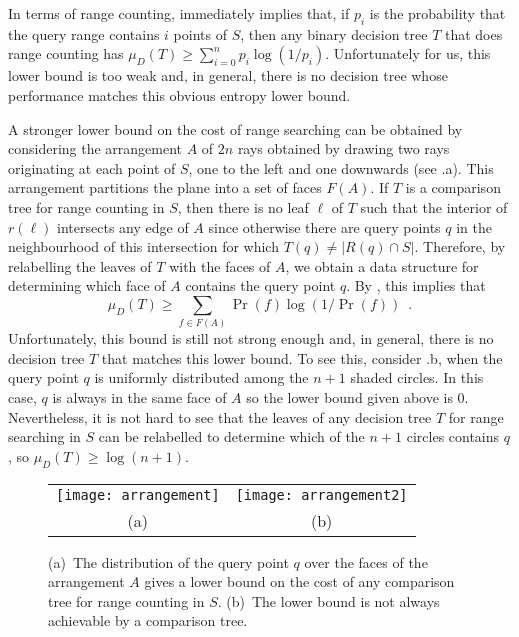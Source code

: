 \documentclass[lotsofwhite,charterfonts]{patmorin}
\begin{document}
In terms of range counting,  immediately implies that,
if $p_i$ is the probability that the query range contains $i$ points
of $S$, then any binary decision tree $T$ that does range counting has
$\mu_D(T) \ge \sum_{i=0}^{n} p_i\log(1/p_i)$.  Unfortunately for us,
this lower bound is too weak and, in general, there is no decision
tree whose performance matches this obvious entropy lower bound.

A stronger lower bound on the cost of range searching can be obtained
by considering the arrangement $A$ of $2n$ rays obtained by drawing
two rays originating at each point of $S$, one to the left and one
downwards (see .a).  This arrangement partitions
the plane into a set of faces $F(A)$.  If $T$ is a comparison tree for
range counting in $S$, then there is no leaf $\ell$ of $T$ such that
the interior of $r(\ell)$ intersects any edge of $A$ since otherwise
there are query points $q$ in the neighbourhood of this intersection
for which $T(q)\neq |R(q)\cap S|$.  Therefore, by relabelling the leaves
of $T$ with the faces of $A$, we obtain a data structure for
determining which face of $A$ contains the query point $q$.
By , this implies that
\[
   \mu_D(T) \ge \sum_{f\in F(A)} \Pr(f)\log(1/\Pr(f)) \enspace .
\]
Unfortunately, this bound is still not strong enough and, in general,
there is no decision tree $T$ that matches this lower bound.  To see
this, consider .b, when the query point $q$ is
uniformly distributed among the $n+1$ shaded circles.  In this case,
$q$ is always in the same face of $A$ so the lower bound given above
is 0.  Nevertheless, it is not hard to see that the leaves of
any decision tree $T$ for range searching in $S$ can be relabelled to
determine which of the $n+1$ circles contains $q$, so $\mu_D(T) \ge
\log(n+1)$.

\begin{figure}
  \begin{center}
    \begin{tabular}{cc}
      \texttt{[image: arrangement]} &
      \texttt{[image: arrangement2]} \\
        (a) & (b)
    \end{tabular}
  \end{center}
  \caption{(a)~The distribution of the query point $q$ over the faces
     of the arrangement $A$ gives a lower bound on the cost of any
     comparison tree for range counting in $S$. (b)~The lower bound is
     not always achievable by a comparison tree.}
\end{figure}
\end{document}
